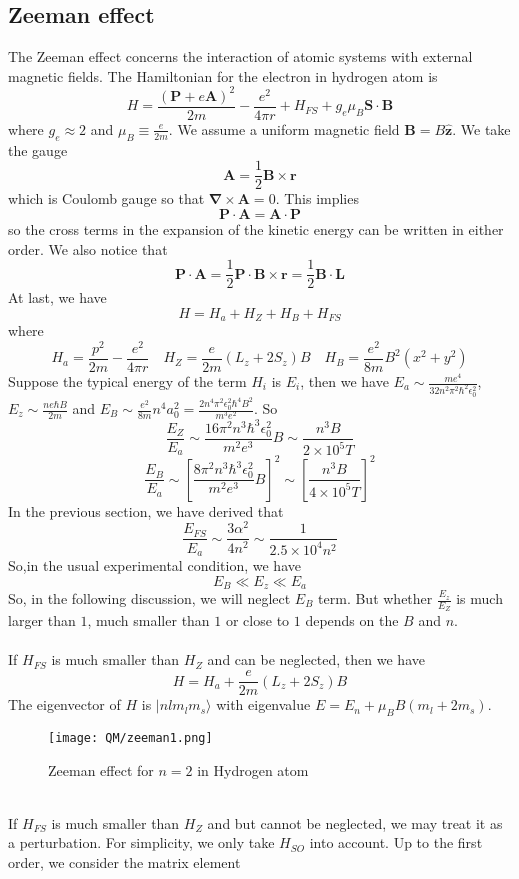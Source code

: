 \subsection{Zeeman effect}
The Zeeman effect concerns the interaction of atomic systems with external magnetic fields. The Hamiltonian for the electron in hydrogen atom is
\[H = \frac{(\bm{P}+e\bm{A})^2}{2m} - \frac{e^2}{4\pi r} + H_{FS} + g_e \mu_B\bm{S}\cdot\bm{B}\]
where $g_e \approx 2$ and $\mu_B \equiv \frac{e}{2m}$.
We assume a uniform magnetic field $\bm{B} = B\hat{\bm{z}}$. We take the gauge
\[\bm{A} = \frac{1}{2}\bm{B}\times\bm{r}\]
which is Coulomb gauge so that $\bm{\nabla}\times\bm{A} = 0$. This implies
\[\bm{P}\cdot\bm{A} = \bm{A}\cdot\bm{P}\]
so the cross terms in the expansion of the kinetic energy can be written in either order. We also notice that
\[\bm{P}\cdot\bm{A} = \frac{1}{2} \bm{P}\cdot\bm{B}\times\bm{r}  = \frac{1}{2}\bm{B}\cdot\bm{L}\] 
At last, we have
\[H = H_a + H_Z + H_B + H_{FS}\]
where
\[H_a = \frac{p^2}{2m} - \frac{e^2}{4\pi r} \quad  H_Z = \frac{e}{2m}(L_z + 2S_z)B \quad H_B = \frac{e^2}{8m}B^2(x^2+y^2)\]
Suppose the typical energy of the term $H_{i}$ is $E_i$, then we have $E_a \sim \frac{me^4}{32 n^2 \pi^2\hbar^2\epsilon_0^2}$, $E_z \sim \frac{ne\hbar B}{2m}$ and $E_B \sim \frac{e^2}{8m}n^4 a_0^2 = \frac{2n^4\pi^2 \epsilon_0^2 \hbar^4 B^2}{m^3 e^2}$. So
\[\frac{E_Z}{E_a} \sim \frac{16\pi^2 n^3 \hbar^3 \epsilon_0^2}{m^2 e^3} B \sim \frac{n^3B}{2\times10^5 T}\]
\[\frac{E_B}{E_a} \sim \left[ \frac{8\pi^2 n^3 \hbar^3 \epsilon_0^2}{m^2 e^3} B\right]^2 \sim \left[ \frac{n^3B}{4\times10^5 T} \right]^2\]
In the previous section, we have derived that
\[\frac{E_{FS}}{E_a} \sim \frac{3\alpha^2}{4n^2} \sim \frac{1}{2.5\times10^4 n^2}\]
So,in the usual experimental condition, we have
\[E_B \ll E_z \ll E_a\]
So, in the following discussion, we will neglect $E_B$ term.
But whether $\frac{E_z}{E_Z}$ is much larger than $1$, much smaller than $1$ or close to $1$ depends on the $B$ and $n$.\\ \\
If $H_{FS}$ is much smaller than $H_Z$ and can be neglected, then we have
\[H = H_a + \frac{e}{2m}(L_z + 2S_z)B\]
The eigenvector of $H$ is $|nlm_lm_s\rangle$ with eigenvalue $E = E_n + \mu_B B(m_l+2m_s)$.
\begin{figure}[!h]
	\centering
	\texttt{[image: QM/zeeman1.png]}
	\caption{Zeeman effect for $n=2$ in Hydrogen atom}
\end{figure}\\
If $H_{FS}$ is much smaller than $H_Z$ and but cannot be neglected, we may treat it as a perturbation. For simplicity, we only take $H_{SO}$ into account. Up to the first order, we consider the matrix element
